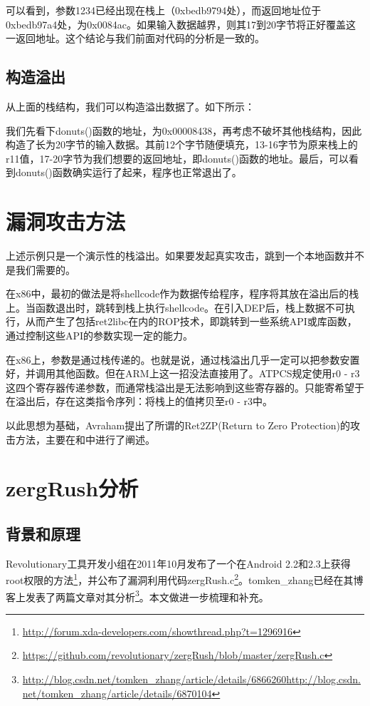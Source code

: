 

可以看到，参数1234已经出现在栈上（0xbedb9794处），而返回地址位于0xbedb97a4处，为0x0084ac。如果输入数据越界，则其17到20字节将正好覆盖这一返回地址。这个结论与我们前面对代码的分析是一致的。

\subsection{构造溢出}
从上面的栈结构，我们可以构造溢出数据了。如下所示：



我们先看下donuts()函数的地址，为0x00008438，再考虑不破坏其他栈结构，因此构造了长为20字节的输入数据。其前12个字节随便填充，13-16字节为原来栈上的r11值，17-20字节为我们想要的返回地址，即donuts()函数的地址。最后，可以看到donuts()函数确实运行了起来，程序也正常退出了。

\section{漏洞攻击方法}
上述示例只是一个演示性的栈溢出。如果要发起真实攻击，跳到一个本地函数并不是我们需要的。

在x86中，最初的做法是将shellcode作为数据传给程序，程序将其放在溢出后的栈上。当函数退出时，跳转到栈上执行shellcode。在引入DEP后，栈上数据不可执行，从而产生了包括ret2libc在内的ROP技术，即跳转到一些系统API或库函数，通过控制这些API的参数实现一定的能力。

在x86上，参数是通过栈传递的。也就是说，通过栈溢出几乎一定可以把参数安置好，并调用其他函数。但在ARM上这一招没法直接用了。ATPCS规定使用r0 - r3这四个寄存器传递参数，而通常栈溢出是无法影响到这些寄存器的。只能寄希望于在溢出后，存在这类指令序列：将栈上的值拷贝至r0 - r3中。

以此思想为基础，Avraham提出了所谓的Ret2ZP(Return to Zero Protection)的攻击方法，主要在\cite{arm_stack_exploitation}和\cite{arm_exploitation}中进行了阐述。

\section{zergRush分析}
\subsection{背景和原理}
Revolutionary工具开发小组在2011年10月发布了一个在Android 2.2和2.3上获得root权限的方法\footnote{\url{http://forum.xda-developers.com/showthread.php?t=1296916}}，并公布了漏洞利用代码zergRush.c\footnote{\url{https://github.com/revolutionary/zergRush/blob/master/zergRush.c}}。tomken\_zhang已经在其博客上发表了两篇文章对其分析\footnote{\url{http://blog.csdn.net/tomken\_zhang/article/details/6866260}\newline\url{http://blog.csdn.net/tomken\_zhang/article/details/6870104}}。本文做进一步梳理和补充。

